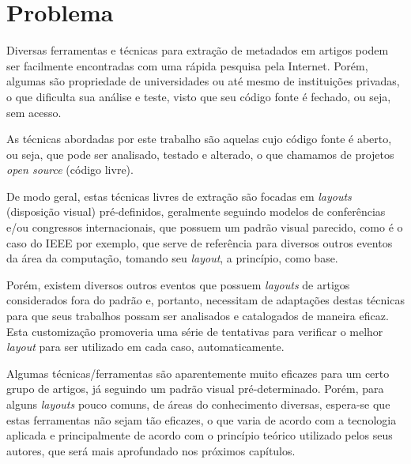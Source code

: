 \section{Problema}
\label{sec:problem}


\begin{textnew}
Diversas ferramentas e técnicas para extração de metadados em artigos podem ser facilmente encontradas com uma rápida pesquisa pela Internet. Porém, algumas são propriedade de universidades ou até mesmo de instituições privadas, o que dificulta sua análise e teste, visto que seu código fonte é fechado, ou seja, sem acesso.
\end{textnew}

\begin{textedited}
As técnicas abordadas por este trabalho são aquelas cujo código fonte é aberto, ou seja, que pode ser analisado, testado e alterado, o que chamamos de projetos \textit{open source} (código livre).
\end{textedited}

De modo geral, estas técnicas livres de extração são focadas em \textit{layouts} (disposição visual) pré-definidos, geralmente seguindo modelos de conferências e/ou congressos internacionais, que possuem um padrão visual parecido, como é o caso do IEEE por exemplo, que serve de referência para diversos outros eventos da área da computação, tomando seu \textit{layout}, a princípio, como base.

Porém, existem diversos outros eventos que possuem \textit{layouts} de artigos considerados fora do padrão e, portanto, necessitam de adaptações destas técnicas para que seus trabalhos possam ser analisados e catalogados de maneira eficaz. Esta customização promoveria uma série de tentativas para verificar o melhor \textit{layout} para ser utilizado em cada caso, automaticamente.

\begin{textedited}
Algumas técnicas/ferramentas são aparentemente muito eficazes para um certo grupo de artigos, já seguindo um padrão visual pré-determinado. Porém, para alguns \textit{layouts} pouco comuns, de áreas do conhecimento diversas, espera-se que estas ferramentas não sejam tão eficazes, o que varia de acordo com a tecnologia aplicada e principalmente de acordo com o princípio teórico utilizado pelos seus autores, que será mais aprofundado nos próximos capítulos.
\end{textedited}

